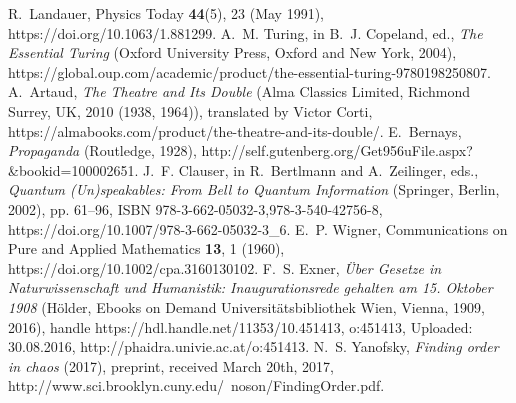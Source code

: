 \documentclass{ws-procs9x6}
\begin{document}
%
% 
% 


\begin{thebibliography}{10}
\providecommand*{\bibinfo}[2]{#2}
\providecommand*{\eprint}[1]{#1}
\providecommand*{\url}[1]{#1}
\bibinfo{author}{R.~Landauer}, \bibinfo{journal}{Physics Today}
  \bibinfo{volume}{\textbf{44}}(5), \bibinfo{pages}{23} (\bibinfo{date}{May
  1991}), \url{https://doi.org/10.1063/1.881299}.
\bibinfo{author}{A.~M. Turing}, in \bibinfo{editors}{B.~J. Copeland}, ed.,
  \emph{The Essential {T}uring} (\bibinfo{publisher}{Oxford University Press},
  Oxford and New York, \bibinfo{year}{2004}),
  \url{https://global.oup.com/academic/product/the-essential-turing-9780198250807}.
\bibinfo{author}{A.~Artaud}, \bibinfo{title}{\emph{The Theatre and Its Double}}
  (\bibinfo{publisher}{Alma Classics Limited}, Richmond Surrey, UK,
  \bibinfo{year}{2010 (1938, 1964)}), translated by Victor Corti,
  \url{https://almabooks.com/product/the-theatre-and-its-double/}.
\bibinfo{author}{E.~Bernays}, \bibinfo{title}{\emph{Propaganda}}
  (\bibinfo{publisher}{Routledge}, \bibinfo{year}{1928}),
  \url{http://self.gutenberg.org/Get956uFile.aspx?&bookid=100002651}.
\bibinfo{author}{J.~F. Clauser}, in \bibinfo{editors}{R.~Bertlmann and
  A.~Zeilinger}, eds., \emph{Quantum (Un)speakables: {F}rom {B}ell to Quantum
  Information} (\bibinfo{publisher}{Springer}, Berlin, \bibinfo{year}{2002}),
  \bibinfo{pages}{pp. 61--96}, ISBN
  \bibinfo{isbn}{978-3-662-05032-3,978-3-540-42756-8},
  \url{https://doi.org/10.1007/978-3-662-05032-3\_6}.
\bibinfo{author}{E.~P. Wigner}, \bibinfo{journal}{Communications on Pure and
  Applied Mathematics} \bibinfo{volume}{\textbf{13}}, \bibinfo{pages}{1}
  (\bibinfo{date}{1960}), \url{https://doi.org/10.1002/cpa.3160130102}.
\bibinfo{author}{F.~S. Exner}, \bibinfo{title}{\emph{{\"U}ber {G}esetze in
  {N}aturwissenschaft und {H}umanistik: {I}naugurationsrede gehalten am 15.
  {O}ktober 1908}} (\bibinfo{publisher}{H\"older, Ebooks on Demand
  Universit\"atsbibliothek Wien}, Vienna, \bibinfo{year}{1909, 2016}), handle
  https://hdl.handle.net/11353/10.451413, o:451413, Uploaded: 30.08.2016,
  \url{http://phaidra.univie.ac.at/o:451413}.
\bibinfo{author}{N.~S. Yanofsky}, \bibinfo{title}{\emph{Finding order in
  chaos}} (\bibinfo{date}{2017}), preprint, received March 20th, 2017,
  \url{http://www.sci.brooklyn.cuny.edu/~noson/FindingOrder.pdf}.

\end{thebibliography}
\end{document}
